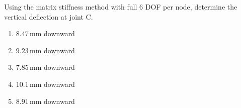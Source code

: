 \documentclass[12pt,a4paper]{article}
\begin{document}
\begin{questionbox}
Using the matrix stiffness method with full 6 DOF per node, determine the vertical 
deflection at joint C.

\begin{mcqbox}
\begin{enumerate}[label=(\Alph*),leftmargin=*]
    \item $8.47\,\text{mm}$ downward
    \item $9.23\,\text{mm}$ downward
    \item $7.85\,\text{mm}$ downward
    \item $10.1\,\text{mm}$ downward
    \item $8.91\,\text{mm}$ downward
\end{enumerate}
\end{mcqbox}
\end{questionbox}
\end{document}
